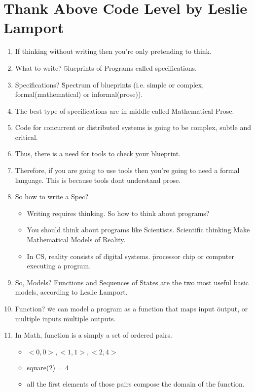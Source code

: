 \documentclass{article}
\begin{document}
    \section{Thank Above Code Level by Leslie Lamport}
 \begin{enumerate}
        \item If thinking without writing then you're only pretending to think.
        \item What to write? \= blueprints of Programs called specifications.
        \item Specifications? \= Spectrum of blueprints (i.e. simple or complex, formal(mathematical) or informal(prose)).
        \item The best type of specifications are in middle\- called Mathematical Prose.
        \item Code for concurrent or distributed systems is going to be complex, subtle and critical.
        \item Thus, there is a need for tools to check your blueprint.
        \item Therefore, if you are going to use tools then you're going to need a formal language. This is because tools dont understand prose.
        \item So how to write a Spec? \begin{itemize}
            \item Writing requires thinking. So how to think about programs?
            \item You should think about programs like Scientists. \= Scientific thinking \= Make Mathematical Models of Reality.
            \item In CS, reality consists of digital systems. \= processor chip or computer executing a program. \end{itemize}
        \item So, Models? \= Functions and Sequences of States are the two most useful basic models, according to Leslie Lamport.
        \item Function? \= we can model a program as a function that maps input \= output, or multiple inputs \= multiple outputs.
        \item In Math, function is a simply a set of ordered pairs.
            \begin{itemize}
            \item ${<0,0>, <1,1>, <2,4>} $
            \item square(2) = 4
            \item all the first elements of those pairs compose the domain of the function. 

\end{itemize}
\end{enumerate}
\end{document}
